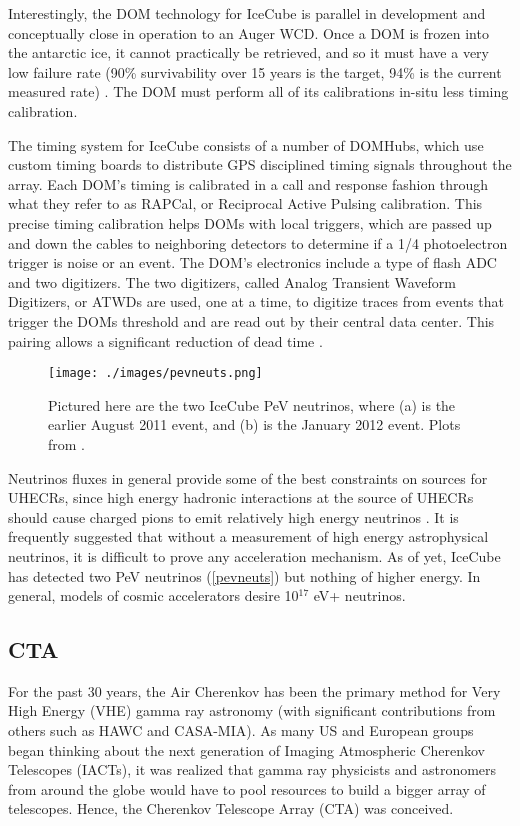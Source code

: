Interestingly, the DOM technology for IceCube is parallel in development and conceptually close in operation to an Auger WCD. Once a DOM is frozen into the antarctic ice, it cannot practically be retrieved, and so it must have a very low failure rate (90\% survivability over 15 years is the target, 94\% is the current measured rate) \cite{icedom}. The DOM must perform all of its calibrations in-situ less timing calibration. 

The timing system for IceCube consists of a number of DOMHubs, which use custom timing boards to distribute GPS disciplined timing signals throughout the array. Each DOM's timing is calibrated in a call and response fashion through what they refer to as RAPCal, or Reciprocal Active Pulsing calibration. This precise timing calibration helps DOMs with local triggers, which are passed up and down the cables to neighboring detectors to determine if a 1/4 photoelectron trigger is noise or an event. The DOM's electronics include a type of flash ADC and two digitizers. The two digitizers, called Analog Transient Waveform Digitizers, or ATWDs are used, one at a time, to digitize traces from events that trigger the DOMs threshold and are read out by their central data center. This pairing allows a significant reduction of dead time \cite{icebasic, icedom}.

\begin{figure}[h!]
\begin{center}
\texttt{[image: ./images/pevneuts.png]}
\caption[IceCube PeV Neutrino Events]{Pictured here are the two IceCube PeV neutrinos, where (a) is the earlier August 2011 event, and (b) is the January 2012 event. Plots from \cite{pevneuts}.}
\label{pevneuts}
\end{center}
\end{figure}

Neutrinos fluxes in general provide some of the best constraints on sources for UHECRs, since high energy hadronic interactions at the source of UHECRs should cause charged pions to emit relatively high energy neutrinos \cite{foteini,pulsarno}. It is frequently suggested that without a measurement of high energy astrophysical neutrinos, it is difficult to prove any acceleration mechanism. As of yet, IceCube has detected two PeV neutrinos (\autoref{pevneuts}) but nothing of higher energy. In general, models of cosmic accelerators desire 10$^17$ eV+ neutrinos.


\subsection{CTA}
\label{cta}
For the past 30 years, the Air Cherenkov has been the primary method for Very High Energy (VHE) gamma ray astronomy (with significant contributions from others such as HAWC and CASA-MIA). As many US and European groups began thinking about the next generation of Imaging Atmospheric Cherenkov Telescopes (IACTs),  it was realized that gamma ray physicists and astronomers from around the globe would have to pool resources to build a bigger array of telescopes. Hence, the Cherenkov Telescope Array (CTA) was conceived. 

